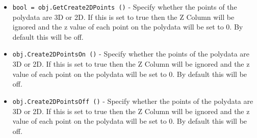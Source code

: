 \begin{itemize}
\item  \verb|bool = obj.GetCreate2DPoints ()| -  Specify whether the points of the polydata are 3D or 2D. If this is set to
 true then the Z Column will be ignored and the z value of each point on the 
 polydata will be set to 0. By default this will be off.

\item  \verb|obj.Create2DPointsOn ()| -  Specify whether the points of the polydata are 3D or 2D. If this is set to
 true then the Z Column will be ignored and the z value of each point on the 
 polydata will be set to 0. By default this will be off.

\item  \verb|obj.Create2DPointsOff ()| -  Specify whether the points of the polydata are 3D or 2D. If this is set to
 true then the Z Column will be ignored and the z value of each point on the 
 polydata will be set to 0. By default this will be off.

\end{itemize}
